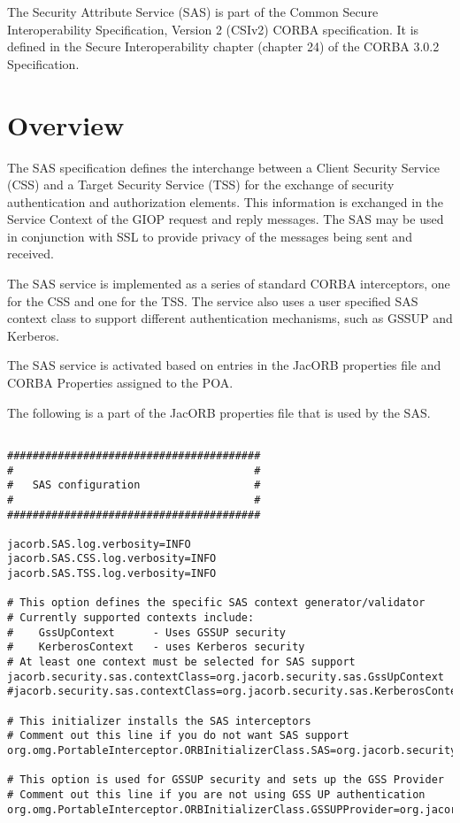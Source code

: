 
The Security Attribute Service (SAS) is part of the Common Secure 
Interoperability Specification, Version 2 (CSIv2) CORBA specification.
It is defined in the Secure Interoperability chapter (chapter 24) of the
CORBA 3.0.2 Specification.

\section{Overview}

The SAS specification defines the interchange between a Client Security 
Service (CSS) and a Target Security Service (TSS)
for the exchange of security authentication and authorization
elements. This information is exchanged in the Service Context of the GIOP
request and reply messages. The SAS may be used in conjunction with SSL to
provide privacy of the messages being sent and received.

The SAS service is implemented as a series of standard CORBA interceptors,
one for the CSS and one for the TSS. The service also uses a user specified
SAS context class to support different authentication mechanisms, such as
GSSUP and Kerberos.

The SAS service is activated based on entries in the JacORB properties file
and CORBA Properties assigned to the POA.

The following is a part of the JacORB properties file that is used by 
the SAS.

\begin{scriptsize}
\begin{verbatim}

########################################
#                                      #
#   SAS configuration                  #
#                                      #
########################################

jacorb.SAS.log.verbosity=INFO
jacorb.SAS.CSS.log.verbosity=INFO
jacorb.SAS.TSS.log.verbosity=INFO

# This option defines the specific SAS context generator/validator
# Currently supported contexts include:
#    GssUpContext      - Uses GSSUP security
#    KerberosContext   - uses Kerberos security
# At least one context must be selected for SAS support
jacorb.security.sas.contextClass=org.jacorb.security.sas.GssUpContext
#jacorb.security.sas.contextClass=org.jacorb.security.sas.KerberosContext

# This initializer installs the SAS interceptors
# Comment out this line if you do not want SAS support
org.omg.PortableInterceptor.ORBInitializerClass.SAS=org.jacorb.security.sas.SASInitializer

# This option is used for GSSUP security and sets up the GSS Provider
# Comment out this line if you are not using GSS UP authentication
org.omg.PortableInterceptor.ORBInitializerClass.GSSUPProvider=org.jacorb.security.sas.GSSUPProviderInitializer
\end{verbatim}
\end{scriptsize}


